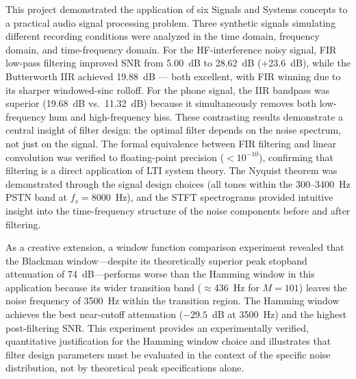 \documentclass[journal]{IEEEtran}
\begin{document}
This project demonstrated the application of six Signals and Systems concepts
to a practical audio signal processing problem. Three synthetic signals simulating
different recording conditions were analyzed in the time domain, frequency domain,
and time-frequency domain. For the HF-interference noisy signal, FIR low-pass
filtering improved SNR from 5.00~dB to 28.62~dB (+23.6~dB), while the Butterworth
IIR achieved 19.88~dB — both excellent, with FIR winning due to its sharper
windowed-sinc rolloff. For the phone signal, the IIR bandpass was superior
(19.68~dB vs.\ 11.32~dB) because it simultaneously removes both low-frequency
hum and high-frequency hiss. These contrasting results demonstrate a central
insight of filter design: the optimal filter depends on the noise spectrum, not
just on the signal. The formal equivalence between FIR filtering and linear
convolution was verified to floating-point precision ($<10^{-10}$), confirming
that filtering is a direct application of LTI system theory. The Nyquist
theorem was demonstrated through the signal design choices (all tones within
the 300--3400~Hz PSTN band at $f_s = 8000$~Hz), and the STFT spectrograms
provided intuitive insight into the time-frequency structure of the noise
components before and after filtering.

As a creative extension, a window function comparison experiment revealed that
the Blackman window—despite its theoretically superior peak stopband attenuation
of 74~dB—performs worse than the Hamming window in this application because
its wider transition band ($\approx$436~Hz for $M=101$) leaves the noise
frequency of 3500~Hz within the transition region. The Hamming window achieves
the best near-cutoff attenuation ($-29.5$~dB at 3500~Hz) and the highest
post-filtering SNR. This experiment provides an experimentally verified,
quantitative justification for the Hamming window choice and illustrates that
filter design parameters must be evaluated in the context of the specific
noise distribution, not by theoretical peak specifications alone.



\end{document}
